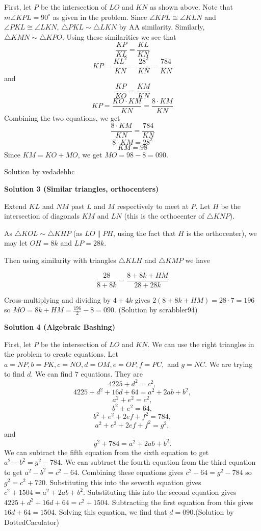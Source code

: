 \begin{enumerate}
 First, let $P$ be the intersection of $LO$ and $KN$ as shown above. Note that $m\angle KPL = 90^{\circ}$ as given in the problem. Since $\angle KPL \cong \angle KLN$ and $\angle PKL \cong \angle LKN$, $\triangle PKL \sim \triangle LKN$ by AA similarity. Similarly, $\triangle KMN \sim \triangle KPO$. Using these similarities we see that
 \[\frac{KP}{KL} = \frac{KL}{KN}\]
 \[KP = \frac{KL^2}{KN} = \frac{28^2}{KN} = \frac{784}{KN}\]and
 \[\frac{KP}{KO} = \frac{KM}{KN}\]
 \[KP = \frac{KO \cdot KM}{KN} = \frac{8\cdot KM}{KN}\]Combining the two equations, we get
 \[\frac{8\cdot KM}{KN} = \frac{784}{KN}\]
 \[8 \cdot KM = 28^2\]
 \[KM = 98\]Since $KM = KO + MO$, we get $MO = 98 -8 = \boxed{090}$.

 Solution by vedadehhc

 



\textbf{Solution 3 (Similar triangles, orthocenters)}

Extend $KL$ and $NM$ past $L$ and $M$ respectively to meet at $P$. Let $H$ be the intersection of diagonals $KM$ and $LN$ (this is the orthocenter of $\triangle KNP$).

 As $\triangle KOL \sim \triangle KHP$ (as $LO \parallel PH$, using the fact that $H$ is the orthocenter), we may let $OH = 8k$ and $LP = 28k$.

 Then using similarity with triangles $\triangle KLH$ and $\triangle KMP$ we have

 
 \[\frac{28}{8+8k} = \frac{8+8k+HM}{28+28k}\]

 Cross-multiplying and dividing by $4+4k$ gives $2(8+8k+HM) = 28 \cdot 7 = 196$ so $MO = 8k + HM = \frac{196}{2} - 8 = \boxed{090}$. (Solution by scrabbler94)

 



\textbf{Solution 4 (Algebraic Bashing)}

First, let $P$ be the intersection of $LO$ and $KN$. We can use the right triangles in the problem to create equations. Let $a=NP, b=PK, c=NO, d=OM, e=OP, f=PC,$ and $g=NC.$ We are trying to find $d.$ We can find $7$ equations. They are
 \[4225+d^2=c^2,\]
 \[4225+d^2+16d+64=a^2+2ab+b^2,\]
 \[a^2+e^2=c^2,\]
 \[b^2+e^2=64,\]
 \[b^2+e^2+2ef+f^2=784,\]
 \[a^2+e^2+2ef+f^2=g^2,\]and 
 \[g^2+784=a^2+2ab+b^2.\]We can subtract the fifth equation from the sixth equation to get $a^2-b^2=g^2-784.$ We can subtract the fourth equation from the third equation to get $a^2-b^2=c^2-64.$ Combining these equations gives $c^2-64=g^2-784$ so $g^2=c^2+720.$ Substituting this into the seventh equation gives $c^2+1504=a^2+2ab+b^2.$ Substituting this into the second equation gives $4225+d^2+16d+64=c^2+1504$. Subtracting the first equation from this gives $16d+64=1504.$ Solving this equation, we find that $d=\boxed{090}.$(Solution by DottedCaculator)


\end{enumerate}
